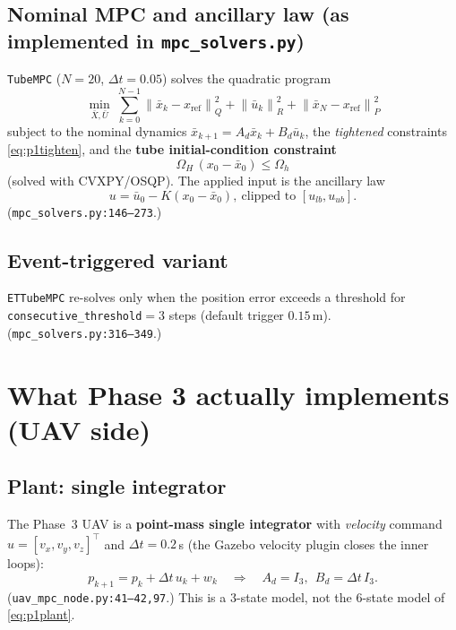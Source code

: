 \documentclass[11pt]{article}
\newcommand{\norm}[1]{\left\lVert #1 \right\rVert}
\newcommand{\code}[1]{\texttt{#1}}
\begin{document}
\subsection{Nominal MPC and ancillary law (as implemented in \code{mpc\_solvers.py})}
\code{TubeMPC} ($N=20$, $\Delta t=0.05$) solves the quadratic program
\begin{equation}
\min_{\bar X,\bar U}\ \sum_{k=0}^{N-1}\norm{\bar x_k-x_{\mathrm{ref}}}_Q^2+\norm{\bar u_k}_R^2
+\norm{\bar x_N-x_{\mathrm{ref}}}_P^2
\end{equation}
subject to the nominal dynamics $\bar x_{k+1}=A_d\bar x_k+B_d\bar u_k$, the \emph{tightened}
constraints \eqref{eq:p1tighten}, and the \textbf{tube initial-condition constraint}
\begin{equation}
\Omega_H\,(x_0-\bar x_0)\le\Omega_h
\label{eq:p1ic}
\end{equation}
(solved with CVXPY/OSQP). The applied input is the ancillary law
\begin{equation}
u=\bar u_0-K(x_0-\bar x_0),\ \text{clipped to }[u_{lb},u_{ub}] .
\label{eq:p1anc}
\end{equation}
(\code{mpc\_solvers.py:146--273}.)

\subsection{Event-triggered variant}
\code{ETTubeMPC} re-solves only when the position error exceeds a threshold for
\code{consecutive\_threshold}$=3$ steps (default trigger $0.15$\,m). (\code{mpc\_solvers.py:316--349}.)

\section{What Phase 3 actually implements (UAV side)}

\subsection{Plant: single integrator}
The Phase~3 UAV is a \textbf{point-mass single integrator} with \emph{velocity} command
$u=[v_x,v_y,v_z]^\top$ and $\Delta t=0.2$\,s (the Gazebo velocity plugin closes the inner loops):
\begin{equation}
p_{k+1}=p_k+\Delta t\,u_k+w_k\quad\Longrightarrow\quad A_d=I_3,\ \ B_d=\Delta t\,I_3 .
\label{eq:p3plant}
\end{equation}
(\code{uav\_mpc\_node.py:41--42,97}.) This is a $3$-state model, not the $6$-state model of
\eqref{eq:p1plant}.
\end{document}
